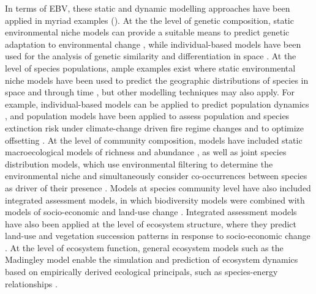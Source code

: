 \documentclass[titlesmallcaps,copyrightpage]{uomthesis}\usepackage[]{graphicx}\usepackage[]{color}
\begin{document}
In terms of EBV, these static and dynamic modelling approaches have been applied in myriad examples (). At the the level of genetic composition, static environmental niche models can provide a suitable means to predict genetic adaptation to environmental change \citep{sillero_distribution_2020}, while individual-based models have been used for the analysis of genetic similarity and differentiation in space \citep{cornell_unified_2019}. At the level of species populations, ample examples exist where static environmental niche models have been used to predict the geographic distributions of species in space and through time \citep{struebig_anticipated_2015}, but other modelling techniques may also apply. For example, individual-based models can be applied to predict population dynamics \citep{deangelis_individual-based_2014}, and population models have been applied to assess population and species extinction risk under climate-change driven fire regime changes \citep{cadenhead_climate_2016} and to optimize offsetting \citep{marshall_quantifying_2021}. At the level of community composition, models have included static macroecological models of richness and abundance \citep{newbold_global_2015}, as well as joint species distribution models, which use environmental filtering to determine the environmental niche and simultaneously consider co-occurrences between species as driver of their presence \citep{pollock_understanding_2014}. Models at species community level have also included integrated assessment models, in which biodiversity models were combined with models of socio-economic and land-use change \citep{leclere_bending_2020}. Integrated assessment models have also been applied at the level of ecosystem structure, where they predict land-use and vegetation succession patterns in response to socio-economic change \citep{fricko_marker_2017, kriegler_fossil-fueled_2017}. At the level of ecosystem function, general ecosystem models such as the Madingley model enable the simulation and prediction of ecosystem dynamics based on empirically derived ecological principals, such as species-energy relationships \citep{harfoot_emergent_2014}. 
\end{document}
